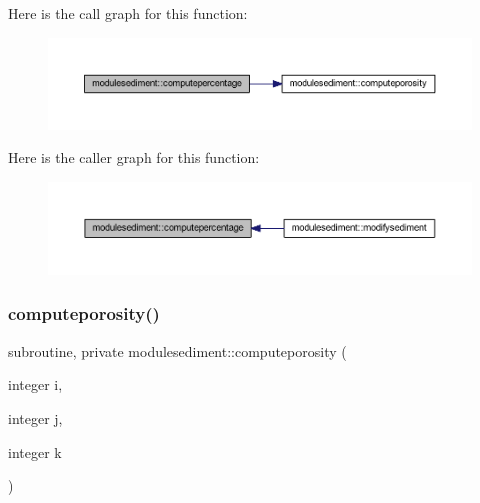 Here is the call graph for this function\+:\nopagebreak
\begin{figure}[H]
\begin{center}
\leavevmode
\includegraphics[width=350pt]{namespacemodulesediment_a967461a16889fe7be50495dad90a178a_cgraph}
\end{center}
\end{figure}
Here is the caller graph for this function\+:\nopagebreak
\begin{figure}[H]
\begin{center}
\leavevmode
\includegraphics[width=350pt]{namespacemodulesediment_a967461a16889fe7be50495dad90a178a_icgraph}
\end{center}
\end{figure}
\mbox{\label{namespacemodulesediment_a12a98e7d5cf87fedaf983b4eb24c1633}} 
\subsubsection{\texorpdfstring{computeporosity()}{computeporosity()}}
{\footnotesize\ttfamily subroutine, private modulesediment\+::computeporosity (\begin{DoxyParamCaption}\item[{integer}]{i,  }\item[{integer}]{j,  }\item[{integer}]{k }\end{DoxyParamCaption})\hspace{0.3cm}{\ttfamily [private]}}

